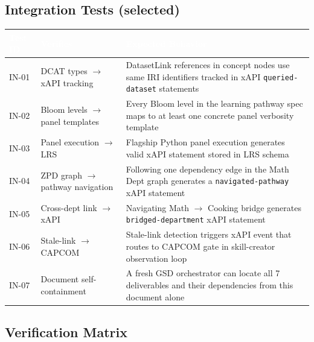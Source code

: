 \documentclass[11pt,letterpaper]{article}
\newcommand{\tableheader}[1]{\textbf{\sffamily\textcolor{white}{#1}}}
\begin{document}
\subsection{Integration Tests (selected)}

\begin{center}
\begin{tabularx}{\textwidth}{L{1.5cm}L{4cm}X}
\toprule
{}
\tableheader{Test ID} & \tableheader{Verifies} & \tableheader{Expected Behavior} \\
\midrule
IN-01 & DCAT types $\rightarrow$ xAPI tracking & DatasetLink references in concept nodes use same IRI identifiers tracked in xAPI \texttt{queried-dataset} statements \\
IN-02 & Bloom levels $\rightarrow$ panel templates & Every Bloom level in the learning pathway spec maps to at least one concrete panel verbosity template \\
IN-03 & Panel execution $\rightarrow$ LRS & Flagship Python panel execution generates valid xAPI statement stored in LRS schema \\
IN-04 & ZPD graph $\rightarrow$ pathway navigation & Following one dependency edge in the Math Dept graph generates a \texttt{navigated-pathway} xAPI statement \\
IN-05 & Cross-dept link $\rightarrow$ xAPI & Navigating Math $\rightarrow$ Cooking bridge generates \texttt{bridged-department} xAPI statement \\
IN-06 & Stale-link $\rightarrow$ CAPCOM & Stale-link detection triggers xAPI event that routes to CAPCOM gate in skill-creator observation loop \\
IN-07 & Document self-containment & A fresh GSD orchestrator can locate all 7 deliverables and their dependencies from this document alone \\
\bottomrule
\end{tabularx}
\end{center}

\subsection{Verification Matrix}
\end{document}
